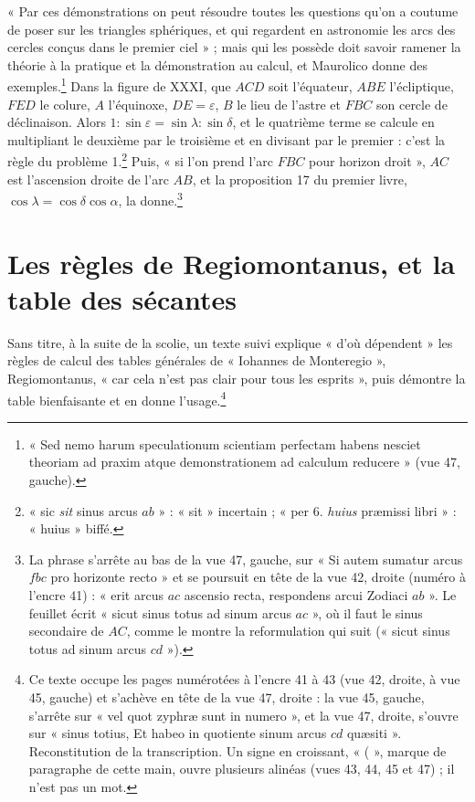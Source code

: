 \documentclass[11pt,a4paper]{article}
\begin{document}
« Par ces démonstrations on peut résoudre toutes les questions qu'on a coutume
de poser sur les triangles sphériques, et qui regardent en astronomie les arcs
des cercles conçus dans le premier ciel » ; mais qui les possède doit savoir
ramener la théorie à la pratique et la démonstration au calcul, et Maurolico
donne des exemples.\footnote{« Sed nemo harum speculationum scientiam perfectam
habens nesciet theoriam ad praxim atque demonstrationem ad calculum reducere »
(vue 47, gauche).} Dans la figure de XXXI, que $ACD$ soit l'équateur, $ABE$
l'écliptique, $FED$ le colure, $A$ l'équinoxe, $DE = \varepsilon$, $B$ le lieu de
l'astre et $FBC$ son cercle de déclinaison. Alors $1 : \sin\varepsilon = \sin
\lambda : \sin\delta$, et le quatrième terme se calcule en multipliant le
deuxième par le troisième et en divisant par le premier : c'est la règle du
problème 1.\footnote{« sic \emph{sit} sinus arcus $ab$ » : « sit » incertain ;
« per 6. \emph{huius} præmissi libri » : « huius » biffé.} Puis, « si l'on prend
l'arc $FBC$ pour horizon droit », $AC$ est l'ascension droite de l'arc $AB$, et la
proposition 17 du premier livre, $\cos\lambda = \cos\delta\cos\alpha$, la
donne.\footnote{La phrase s'arrête au bas de la vue 47, gauche, sur « Si autem
sumatur arcus $fbc$ pro horizonte recto » et se poursuit en tête de la vue 42,
droite (numéro à l'encre 41) : « erit arcus $ac$ ascensio recta, respondens arcui
Zodiaci $ab$ ». Le feuillet écrit « sicut sinus totus ad sinum arcus $ac$ », où il
faut le sinus secondaire de $AC$, comme le montre la reformulation qui suit
(« sicut sinus totus ad sinum arcus $cd$ »).}

\section*{Les règles de Regiomontanus, et la table des sécantes}

Sans titre, à la suite de la scolie, un texte suivi explique « d'où dépendent »
les règles de calcul des tables générales de « Iohannes de Monteregio »,
Regiomontanus, « car cela n'est pas clair pour tous les esprits », puis démontre
la table bienfaisante et en donne l'usage.\footnote{Ce texte occupe les pages
numérotées à l'encre 41 à 43 (vue 42, droite, à vue 45, gauche) et s'achève en
tête de la vue 47, droite : la vue 45, gauche, s'arrête sur « vel quot zyphræ
sunt in numero », et la vue 47, droite, s'ouvre sur « sinus totius, Et habeo in
quotiente sinum arcus $cd$ quæsiti ». Reconstitution de la transcription. Un signe
en croissant, « ( », marque de paragraphe de cette main, ouvre plusieurs
alinéas (vues 43, 44, 45 et 47) ; il n'est pas un mot.}
\end{document}

